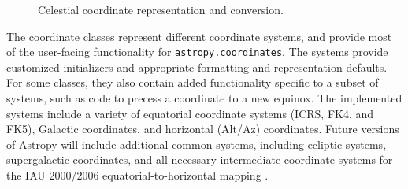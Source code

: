 \documentclass[traditabstract]{aa}
\begin{document}
\begin{figure}
\center
\caption{Celestial coordinate representation and conversion.\label{code:coords}}
\vspace{0.1in}
\label{fig:code_coordinates}
\end{figure}

The coordinate classes represent different coordinate systems, and provide most
of the user-facing functionality for \texttt{astropy.coordinates}. The systems
provide customized initializers and appropriate formatting and representation
defaults. For some classes, they also contain added functionality specific to a
subset of systems, such as code to precess a coordinate to a new equinox. The
implemented systems include a variety of equatorial coordinate systems (ICRS,
FK4, and FK5), Galactic coordinates, and horizontal (Alt/Az) coordinates.
Future versions of Astropy will include additional common systems, including
ecliptic systems, supergalactic coordinates, and all necessary intermediate
coordinate systems for the IAU 2000/2006 equatorial-to-horizontal mapping
\citep[e.g.,][]{soffel03, usnocircular179}.
\end{document}
